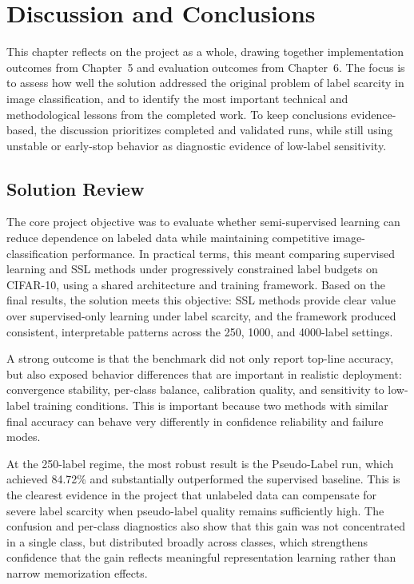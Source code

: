 \chapter{Discussion and Conclusions}
\label{chap:conclusions}

This chapter reflects on the project as a whole, drawing together implementation outcomes from Chapter~5 and evaluation outcomes from Chapter~6. The focus is to assess how well the solution addressed the original problem of label scarcity in image classification, and to identify the most important technical and methodological lessons from the completed work. To keep conclusions evidence-based, the discussion prioritizes completed and validated runs, while still using unstable or early-stop behavior as diagnostic evidence of low-label sensitivity.

\section{Solution Review}

The core project objective was to evaluate whether semi-supervised learning can reduce dependence on labeled data while maintaining competitive image-classification performance. In practical terms, this meant comparing supervised learning and SSL methods under progressively constrained label budgets on CIFAR-10, using a shared architecture and training framework. Based on the final results, the solution meets this objective: SSL methods provide clear value over supervised-only learning under label scarcity, and the framework produced consistent, interpretable patterns across the 250, 1000, and 4000-label settings.

A strong outcome is that the benchmark did not only report top-line accuracy, but also exposed behavior differences that are important in realistic deployment: convergence stability, per-class balance, calibration quality, and sensitivity to low-label training conditions. This is important because two methods with similar final accuracy can behave very differently in confidence reliability and failure modes.

At the 250-label regime, the most robust result is the Pseudo-Label run, which achieved 84.72\% and substantially outperformed the supervised baseline. This is the clearest evidence in the project that unlabeled data can compensate for severe label scarcity when pseudo-label quality remains sufficiently high. The confusion and per-class diagnostics also show that this gain was not concentrated in a single class, but distributed broadly across classes, which strengthens confidence that the gain reflects meaningful representation learning rather than narrow memorization effects.

